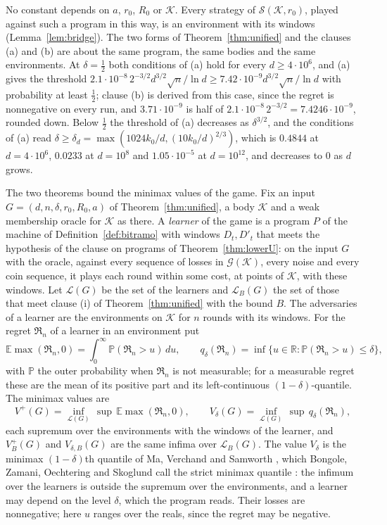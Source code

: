 \documentclass[11pt]{amsart}
\theoremstyle{definition}
\numberwithin{equation}{section}
\newcommand{\R}{\mathbb{R}}
\newcommand{\E}{\mathbb{E}}
\newcommand{\Prob}{\mathbb{P}}
\newcommand{\cK}{\mathcal{K}}
\newcommand{\cG}{\mathscr{G}}
\newcommand{\Reg}{\mathfrak{R}}
\begin{document}
No constant depends on $a$, $r_0$, $R_0$ or $\cK$. Every strategy of $\mathcal S(\cK,r_0)$, played against such a program in this way, is an environment with its windows (Lemma~\ref{lem:bridge}). The two forms of Theorem~\ref{thm:unified} and the clauses (a) and (b) are about the same program, the same bodies and the same environments. At $\delta=\frac12$ both conditions of (a) hold for every $d\ge4\cdot10^6$, and (a) gives the threshold $2.1\cdot10^{-8}\,2^{-3/2}d^{3/2}\sqrt n/\ln d\ge7.42\cdot10^{-9}d^{3/2}\sqrt n/\ln d$ with probability at least $\frac12$; clause (b) is derived from this case, since the regret is nonnegative on every run, and $3.71\cdot10^{-9}$ is half of $2.1\cdot10^{-8}\,2^{-3/2}=7.4246\cdot10^{-9}$, rounded down. Below $\frac12$ the threshold of (a) decreases as $\delta^{3/2}$, and the conditions of (a) read $\delta\ge\delta_d=\max(1024k_0/d,(10k_0/d)^{2/3})$, which is $0.4844$ at $d=4\cdot10^6$, $0.0233$ at $d=10^8$ and $1.05\cdot10^{-5}$ at $d=10^{12}$, and decreases to $0$ as $d$ grows.

The two theorems bound the minimax values of the game. Fix an input $G=(d,n,\delta,r_0,R_0,a)$ of Theorem~\ref{thm:unified}, a body $\cK$ and a weak membership oracle for $\cK$ as there. A \emph{learner} of the game is a program $P$ of the machine of Definition~\ref{def:bitramo} with windows $D_t,D'_t$ that meets the hypothesis of the clause on programs of Theorem~\ref{thm:lowerU}: on the input $G$ with the oracle, against every sequence of losses in $\cG(\cK)$, every noise and every coin sequence, it plays each round within some cost, at points of $\cK$, with these windows. Let $\mathcal L(G)$ be the set of the learners and $\mathcal L_B(G)$ the set of those that meet clause (i) of Theorem~\ref{thm:unified} with the bound $B$. The adversaries of a learner are the environments on $\cK$ for $n$ rounds with its windows. For the regret $\Reg_n$ of a learner in an environment put
\[
\E\max(\Reg_n,0)=\int_0^\infty\Prob(\Reg_n>u)\,du,\qquad q_\delta(\Reg_n)=\inf\{u\in\R:\Prob(\Reg_n>u)\le\delta\},
\]
with $\Prob$ the outer probability when $\Reg_n$ is not measurable; for a measurable regret these are the mean of its positive part and its left-continuous $(1-\delta)$-quantile. The minimax values are
\[
V^+(G)=\inf_{\mathcal L(G)}\,\sup\,\E\max(\Reg_n,0),\qquad V_\delta(G)=\inf_{\mathcal L(G)}\,\sup\,q_\delta(\Reg_n),
\]
each supremum over the environments with the windows of the learner, and $V^+_B(G)$ and $V_{\delta,B}(G)$ are the same infima over $\mathcal L_B(G)$. The value $V_\delta$ is the minimax $(1-\delta)$th quantile of Ma, Verchand and Samworth \cite[Section~2]{MVS24}, which Bongole, Zamani, Oechtering and Skoglund call the strict minimax quantile \cite[Definition~3]{BZOS26}: the infimum over the learners is outside the supremum over the environments, and a learner may depend on the level $\delta$, which the program reads. Their losses are nonnegative; here $u$ ranges over the reals, since the regret may be negative.
\end{document}
